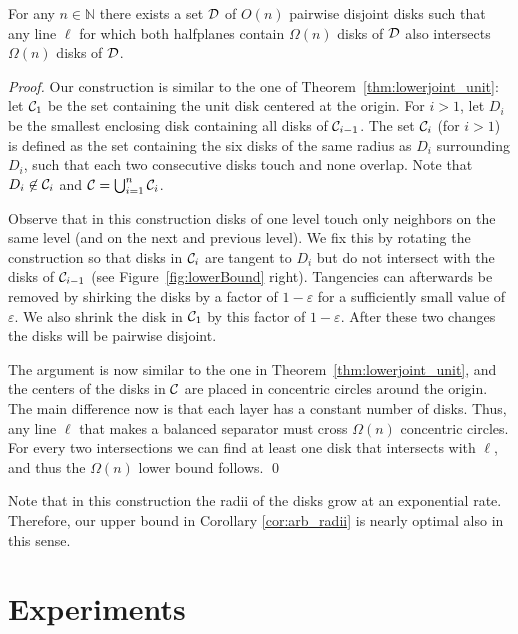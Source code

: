 \documentclass{llncs}
\begin{document}
\begin{theorem}\label{thm:lowerarbitRad}
For any $n\in \mathbb{N}$ there exists a set $\cal{D}$ of $O(n)$ pairwise disjoint disks such that any line $\ell$ for which both halfplanes contain $\Omega(n)$ disks of $\cal{D}$ also 
intersects $\Omega(n)$ disks of $\cal{D}$.
\end{theorem}
\begin{proof}
Our construction is similar to the one of Theorem~\ref{thm:lowerjoint_unit}: let ${\cal C}_1$ be the set containing the unit disk centered at the origin. For $i>1$, let $D_i$ be the smallest enclosing disk containing all disks of ${\cal C}_{i-1}$. The set ${\cal C}_i$ (for $i>1$) is defined as the set containing the six disks of the same radius as $D_i$ surrounding $D_i$, such that each two consecutive disks touch and none overlap. Note that $D_i\not\in {\cal C}_{i}$ and ${\cal C}=\bigcup_{i=1}^n {\cal C}_i$. 

Observe that in this construction disks of one level touch only neighbors on the same level (and on the next and previous level). We fix this by rotating the construction so that disks in ${\cal C}_i$ are tangent to $D_i$ but do not intersect with the disks of ${\cal C}_{i-1}$ (see Figure~\ref{fig:lowerBound} right). Tangencies can afterwards be removed by shirking the disks by a factor of $1-\varepsilon$ for a sufficiently small value of $\varepsilon$. We also shrink the disk in ${\cal C}_1$ by this factor of $1-\varepsilon$. After these two changes the disks will be pairwise disjoint.

The argument is now similar to the one in Theorem~\ref{thm:lowerjoint_unit}, and the centers of the disks in $\cal C$ are placed in concentric circles around the origin. The main difference now is that each layer has a constant number of disks. Thus, any line $\ell$ that makes a balanced separator must cross $\Omega(n)$ concentric circles. For every two intersections we can find at least one disk that intersects with $\ell$, and thus the $\Omega(n)$ lower bound follows. \qed
\end{proof}

Note that in this construction the radii of the disks grow at an exponential rate. 
Therefore, our upper bound in Corollary \ref{cor:arb_radii} is nearly optimal
also in this sense.

\section{Experiments}
\label{sec:experiment}
\end{document}
